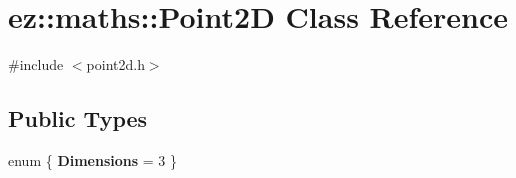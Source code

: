 \hypertarget{classez_1_1maths_1_1Point2D}{}\section{ez\+:\+:maths\+:\+:Point2D Class Reference}
\label{classez_1_1maths_1_1Point2D}


{\ttfamily \#include $<$point2d.\+h$>$}

\subsection*{Public Types}
\begin{DoxyCompactItemize}
\item 
\mbox{\label{classez_1_1maths_1_1Point2D_ab1785d22aac8062b3112a89b01f970a7}} 
enum \{ {\bfseries Dimensions} = 3
 \}
\end{DoxyCompactItemize}
